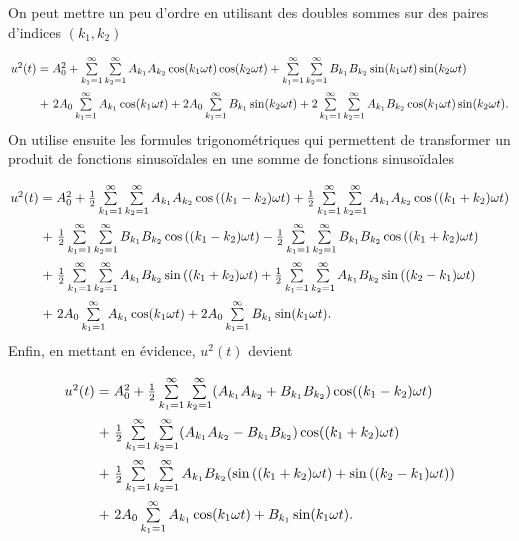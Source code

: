 On peut mettre un peu d'ordre en utilisant des doubles
sommes sur des paires d'indices $(k_1,k_2)$
\[\arraycolsep=1.4pt\def\arraystretch{2.2}
	\begin{array}{cl}
		 u^2(t)	&= A_0^2 + \sum\limits_{k_1=1}^\infty\sum\limits_{k_2=1}^\infty A_{k_1}A_{k_2}\cos(k_1\omega t)\cos(k_2\omega t) 
							+ \sum\limits_{k_1=1}^\infty\sum\limits_{k_2=1}^\infty B_{k_1}B_{k_2}\sin(k_1\omega t)\sin(k_2\omega t)\\ 
						&+~ 2A_0\sum\limits_{k_1=1}^\infty A_{k_1}\cos(k_1\omega t) + 2A_0\sum\limits_{k_1=1}^\infty B_{k_1}\sin(k_2\omega t)
						+ 2\sum\limits_{k_1=1}^\infty\sum\limits_{k_2=1}^\infty A_{k_1}B_{k_2}\cos(k_1\omega t)\sin(k_2\omega t). 
	\end{array}
\]
On utilise ensuite les formules trigonométriques qui
permettent de transformer un produit de fonctions
sinusoïdales en une somme de fonctions sinusoïdales
\[\arraycolsep=1.4pt\def\arraystretch{2.2}
	\begin{array}{cl}
		 u^2(t)	&= A_0^2 + \frac{1}{2}\sum\limits_{k_1=1}^\infty\sum\limits_{k_2=1}^\infty A_{k_1}A_{k_2}\cos\left((k_1-k_2)\omega t\right) 
						+ \frac{1}{2}\sum\limits_{k_1=1}^\infty\sum\limits_{k_2=1}^\infty A_{k_1}A_{k_2}\cos\left((k_1+k_2)\omega t\right)\\ 
						&+~ \frac{1}{2}\sum\limits_{k_1=1}^\infty\sum\limits_{k_2=1}^\infty B_{k_1}B_{k_2}\cos\left((k_1-k_2)\omega t\right)
						- \frac{1}{2}\sum\limits_{k_1=1}^\infty\sum\limits_{k_2=1}^\infty B_{k_1}B_{k_2}\cos\left((k_1+k_2)\omega t\right)\\
						&+~ \frac{1}{2}\sum\limits_{k_1=1}^\infty\sum\limits_{k_2=1}^\infty A_{k_1}B_{k_2}\sin\left((k_1+k_2)\omega t\right)
						+ \frac{1}{2}\sum\limits_{k_1=1}^\infty\sum\limits_{k_2=1}^\infty A_{k_1}B_{k_2}\sin\left((k_2-k_1)\omega t\right)\\
						&+~ 2A_0\sum\limits_{k_1=1}^\infty A_{k_1}\cos(k_1\omega t) + 2A_0\sum\limits_{k_1=1}^\infty B_{k_1}\sin(k_1\omega t).
	\end{array}
\]
Enfin, en mettant en évidence, $u^2(t)$ devient
\[\arraycolsep=1.4pt\def\arraystretch{2.2}
	\begin{array}{cl}
		 u^2(t)	&= A^2_0 + \frac{1}{2}\sum\limits_{k_1=1}^\infty\sum\limits_{k_2=1}^\infty (A_{k_1}A_{k_2}+B_{k_1}B_{k_2})\cos((k_1-k_2)\omega t) \\
						&+~ \frac{1}{2}\sum\limits_{k_1=1}^\infty\sum\limits_{k_2=1}^\infty (A_{k_1}A_{k_2}-B_{k_1}B_{k_2})\cos((k_1+k_2)\omega t) \\
						&+~ \frac{1}{2}\sum\limits_{k_1=1}^\infty\sum\limits_{k_2=1}^\infty A_{k_1}B_{k_2}(\sin\left((k_1+k_2)\omega t\right)
						+\sin\left((k_2-k_1)\omega t\right))\\
						&+~ 2A_0\sum\limits_{k_1=1}^\infty A_{k_1}\cos(k_1\omega t) + B_{k_1}\sin(k_1\omega t).
	\end{array}
\]
